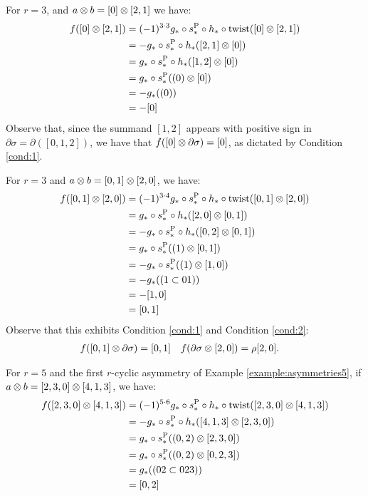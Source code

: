 \begin{example}\label{example:f3_1}
	For $r=3$, and $a \otimes  b = [0] \otimes  [2,1]$ we have:
	\begin{align*}
		f([0] \otimes  [2,1])
		&= (-1)^{3\cdot 3}g_*\circ s_*^{\operatorname{P}}\circ h_*\circ \operatorname{twist}([0] \otimes  [2,1])
		\\
		&= -g_*\circ s_*^{\operatorname{P}}\circ h_*([2,1] \otimes  [0])
		\\
		&= g_*\circ s_*^{\operatorname{P}}\circ h_*([1,2] \otimes  [0])
		\\
		&= g_*\circ s_*^{\operatorname{P}}((0) \otimes  [0])
		\\
		&= -g_*((0))
		\\
		&= -[0]
	\end{align*}
	Observe that, since the summand $[1,2]$ appears with positive sign in $\partial \sigma = \partial([0,1,2])$, we have that $f([0] \otimes  \partial\sigma) = [0]$, as dictated by Condition \eqref{cond:1}.
\end{example}

\begin{example}\label{example:f3_2}
	For $r=3$ and $a \otimes  b = [0,1] \otimes  [2,0]$, we have:
	\begin{align*}
		f([0,1] \otimes  [2,0]) &= (-1)^{3\cdot 4}g_*\circ s_*^{\operatorname{P}}\circ h_*\circ \operatorname{twist}([0,1] \otimes  [2,0])
		\\
		&= g_*\circ s_*^{\operatorname{P}}\circ h_*([2,0] \otimes  [0,1])
		\\
		&= -g_*\circ s_*^{\operatorname{P}}\circ h_*([0,2] \otimes  [0,1])
		\\
		&= g_*\circ s_*^{\operatorname{P}}((1) \otimes  [0,1])
		\\
		&= -g_*\circ s_*^{\operatorname{P}}((1) \otimes  [1,0])
		\\
		&= -g_*((1\subset 01))
		\\
		&= -[1,0]
		\\
		&= [0,1]
	\end{align*}
	Observe that this exhibits Condition \eqref{cond:1} and Condition \eqref{cond:2}:
	\begin{align*}
		f([0,1] \otimes  \partial\sigma) &= [0,1]
		&
		f(\partial\sigma  \otimes  [2,0]) &= \rho[2,0].
	\end{align*}
\end{example}

\begin{example}\label{example:f5_1}
	For $r=5$ and the first $r$-cyclic asymmetry of Example \ref{example:asymmetries5}, if $a \otimes  b = [2,3,0] \otimes  [4,1,3]$, we have:
	\begin{align*}
		f([2,3,0] \otimes  [4,1,3]) &= (-1)^{5\cdot 6}g_*\circ s_*^{\operatorname{P}}\circ h_*\circ \operatorname{twist}([2,3,0] \otimes  [4,1,3])
		\\
		&= -g_*\circ s_*^{\operatorname{P}}\circ h_*([4,1,3] \otimes  [2,3,0])
		\\
		&= g_*\circ s_*^{\operatorname{P}}((0,2) \otimes  [2,3,0])
		\\
		&= g_*\circ s_*^{\operatorname{P}}((0,2) \otimes  [0,2,3])
		\\
		&= g_*((02\subset 023))
		\\
		&= [0,2]
	\end{align*}
\end{example}

